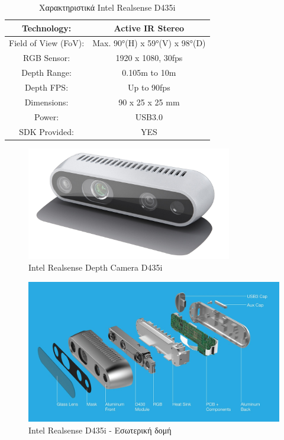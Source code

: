 \begin{table}[H]
    \centering
    \begin{tabular}{|c|c|}
        \hline
        Technology: & Active IR Stereo\\
        \hline
        Field of View (FoV): & Max. 90°(H) x 59°(V) x 98°(D)\\
        \hline
        RGB Sensor: & 1920 x 1080, 30fps\\
        \hline
        Depth Range: & 0.105m to 10m\\
        \hline
        Depth FPS: & Up to 90fps\\
        \hline
        Dimensions: & 90 x 25 x 25 mm\\ 
        \hline
        Power: & USB3.0\\
        \hline
        SDK Provided: & YES\\
        \hline
    \end{tabular}
    \caption{Χαρακτηριστικά Intel Realsense D435i \cite{DepthCam34:online}}
    \label{tab:realsense}
\end{table}
\begin{figure}[H]
    \centering
    \includegraphics[width=0.8\textwidth]{images/intel_realsense.png}
    \caption{Intel Realsense Depth Camera D435i}
    \label{fig:realsense}
\end{figure}
\begin{figure}[H]
    \centering
    \includegraphics[width=\textwidth]{images/d435_inside_depth_camera.jpg}
    \caption{Intel Realsense D435i - Εσωτερική δομή}
    \label{fig:realsense-inside}
\end{figure}

